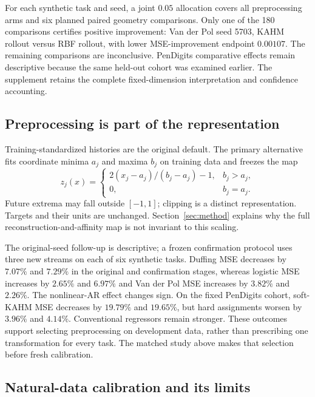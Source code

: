 For each synthetic task and seed, a joint $0.05$ allocation covers all
preprocessing arms and six planned paired geometry comparisons. Only one
of the 180 comparisons certifies positive improvement: Van der Pol seed
5703, KAHM rollout versus RBF rollout, with lower MSE-improvement endpoint
$0.00107$. The remaining comparisons are inconclusive. PenDigits comparative
effects remain descriptive because the same held-out cohort was examined
earlier. The supplement retains the complete fixed-dimension interpretation
and confidence accounting.

\subsection{Preprocessing is part of the representation}
\label{sec:input-scaling}

Training-standardized histories are the original default. The primary
alternative fits coordinate minima $a_j$ and maxima $b_j$ on training data
and freezes the map
\begin{equation}
 z_j(x)=
 \begin{cases}2(x_j-a_j)/(b_j-a_j)-1,&b_j>a_j,\\
 0,&b_j=a_j.\end{cases}
 \label{eq:input-minmax}
\end{equation}
Future extrema may fall outside $[-1,1]$; clipping is a distinct representation.
Targets and their units are unchanged. Section~\ref{sec:method} explains why
the full reconstruction-and-affinity map is not invariant to this scaling.

The original-seed follow-up is descriptive; a frozen confirmation protocol
uses three new streams on each of six synthetic tasks. Duffing MSE decreases
by $7.07\%$ and $7.29\%$ in the original and confirmation stages, whereas
logistic MSE increases by $2.65\%$ and $6.97\%$ and Van der Pol MSE increases
by $3.82\%$ and $2.26\%$. The nonlinear-AR effect changes sign. On the fixed
PenDigits cohort, soft-KAHM MSE decreases by $19.79\%$ and $19.65\%$, but
hard assignments worsen by $3.96\%$ and $4.14\%$. Conventional regressors
remain stronger. These outcomes support selecting preprocessing on development
data, rather than prescribing one transformation for every task. The matched
study above makes that selection before fresh calibration.

\subsection{Natural-data calibration and its limits}
\label{sec:pendigits}
\label{sec:speech}

